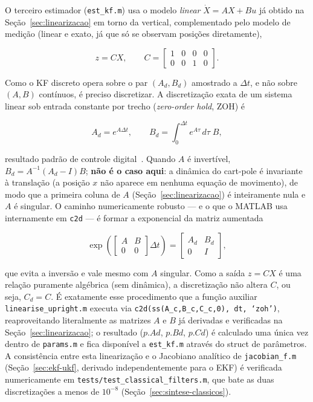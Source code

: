 \documentclass[brazil, 12pt]{article}
\begin{document}
O terceiro estimador (\texttt{est\_kf.m}) usa o modelo \emph{linear}
$\dot X = AX+Bu$ já obtido na Seção~\ref{sec:linearizacao} em torno da vertical,
complementado pelo modelo de medição (linear e exato, já que só se observam
posições diretamente),

\[
z = C X, \qquad
C = \begin{bmatrix} 1 & 0 & 0 & 0 \\ 0 & 0 & 1 & 0 \end{bmatrix}.
\]

Como o KF discreto opera sobre o par $(A_d, B_d)$ amostrado a $\Delta t$, e não
sobre $(A,B)$ contínuos, é preciso discretizar. A discretização exata de um
sistema linear sob entrada constante por trecho (\emph{zero-order hold}, ZOH) é

\[
A_d = e^{A\Delta t}, \qquad
B_d = \int_0^{\Delta t} e^{A\tau}\,d\tau\;B,
\]

resultado padrão de controle digital~\cite{simon2006}.
Quando $A$ é invertível, $B_d = A^{-1}(A_d - I)B$; \textbf{não é o caso aqui}: a
dinâmica do cart-pole é invariante à translação (a posição $x$ não aparece em
nenhuma equação de movimento), de modo que a primeira coluna de $A$
(Seção~\ref{sec:linearizacao}) é inteiramente nula e $A$ é singular. O caminho
numericamente robusto — e o que o MATLAB usa internamente em \texttt{c2d} — é
formar a exponencial da matriz aumentada~\cite{simon2006}

\[
\exp\!\left(
\begin{bmatrix} A & B \\ 0 & 0 \end{bmatrix}\Delta t
\right)
=
\begin{bmatrix} A_d & B_d \\ 0 & I \end{bmatrix},
\]

que evita a inversão e vale mesmo com $A$ singular. Como a saída $z=CX$ é uma
relação puramente algébrica (sem dinâmica), a discretização não altera $C$, ou
seja, $C_d = C$. É exatamente esse procedimento que a função auxiliar
\texttt{linearise\_upright.m} executa via
\texttt{c2d(ss(A\_c,B\_c,C\_c,0), dt, `zoh')}, reaproveitando literalmente as
matrizes $A$ e $B$ já derivadas e verificadas na Seção~\ref{sec:linearizacao};
o resultado ($p.Ad$, $p.Bd$, $p.Cd$) é calculado uma única vez dentro de
\texttt{params.m} e fica disponível a \texttt{est\_kf.m} através do struct de
parâmetros. A consistência entre esta linearização e o Jacobiano analítico de
\texttt{jacobian\_f.m} (Seção~\ref{sec:ekf-ukf}, derivado independentemente
para o EKF) é verificada numericamente em
\texttt{tests/test\_classical\_filters.m}, que bate as duas discretizações a
menos de $10^{-8}$ (Seção~\ref{sec:sintese-classicos}).
\end{document}
